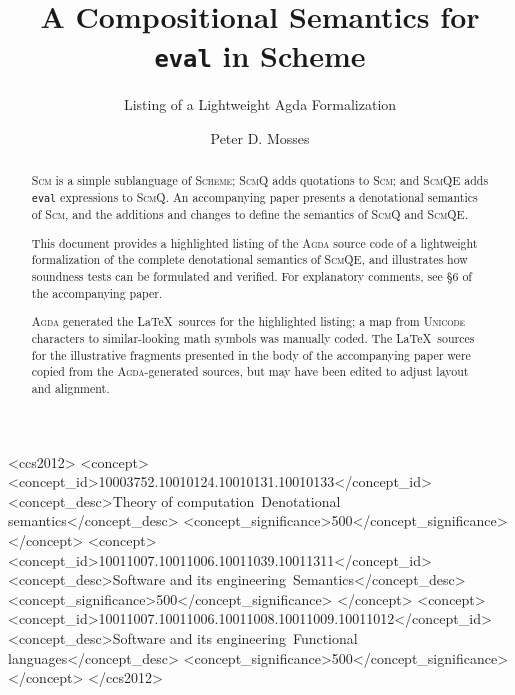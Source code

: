 \documentclass[sigplan,screen,nonacm]{acmart}
\begin{document}
\title{A Compositional Semantics for \texttt{eval} in Scheme}

\subtitle{Listing of a Lightweight Agda Formalization}

\author{Peter D. Mosses}

\begin{abstract}

\textsc{Scm} is a simple sublanguage of \textsc{Scheme};
\textsc{ScmQ} adds quotations to \textsc{Scm}; and
\textsc{ScmQE} adds \texttt{eval} expressions to \textsc{ScmQ}.
An accompanying paper presents a denotational semantics of \textsc{Scm},
and the additions and changes to define the semantics of \textsc{ScmQ}
and \textsc{ScmQE}.

This document provides a highlighted listing of the \textsc{Agda} source code
of a lightweight formalization of the complete denotational semantics of
\textsc{ScmQE}, and illustrates how soundness tests can be formulated and verified.
For explanatory comments, see §6 of the accompanying paper.

\textsc{Agda} generated the \LaTeX\ sources for the highlighted listing;
a map from \textsc{Unicode} characters to similar-looking math symbols was
manually coded. The \LaTeX\ sources for the illustrative fragments presented
in the body of the accompanying paper were copied from the \textsc{Agda}-generated
sources, but may have been edited to adjust layout and alignment.

\end{abstract}

\begin{CCSXML}
<ccs2012>
   <concept>
       <concept_id>10003752.10010124.10010131.10010133</concept_id>
       <concept_desc>Theory of computation~Denotational semantics</concept_desc>
       <concept_significance>500</concept_significance>
       </concept>
  <concept>
       <concept_id>10011007.10011006.10011039.10011311</concept_id>
       <concept_desc>Software and its engineering~Semantics</concept_desc>
       <concept_significance>500</concept_significance>
       </concept>
   <concept>
       <concept_id>10011007.10011006.10011008.10011009.10011012</concept_id>
       <concept_desc>Software and its engineering~Functional languages</concept_desc>
       <concept_significance>500</concept_significance>
       </concept>
 </ccs2012>
\end{CCSXML}
\end{document}
